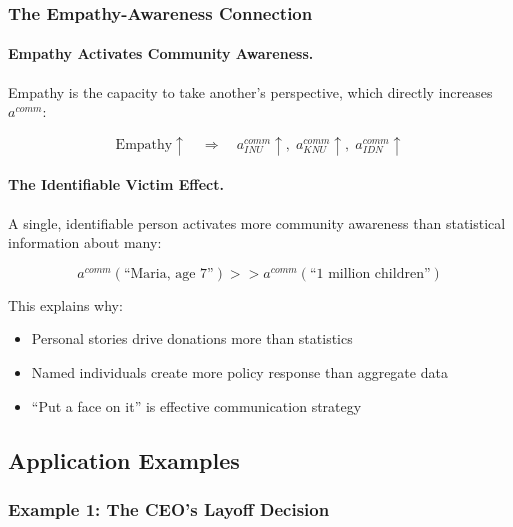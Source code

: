 \subsubsection{The Empathy-Awareness Connection}

\paragraph{Empathy Activates Community Awareness.}
Empathy is the capacity to take another's perspective, which directly 
increases $a^{comm}$:

\begin{equation}
\text{Empathy} \uparrow \quad \Rightarrow \quad a^{comm}_{INU} \uparrow, \; a^{comm}_{KNU} \uparrow, \; a^{comm}_{IDN} \uparrow
\end{equation}

\paragraph{The Identifiable Victim Effect.}
A single, identifiable person activates more community awareness than 
statistical information about many:

\begin{equation}
a^{comm}(\text{``Maria, age 7''}) >> a^{comm}(\text{``1 million children''})
\end{equation}

This explains why:
\begin{itemize}
\item Personal stories drive donations more than statistics
\item Named individuals create more policy response than aggregate data
\item ``Put a face on it'' is effective communication strategy
\end{itemize}

\subsection{Application Examples}
\label{subsec:awareness-examples}

\subsubsection{Example 1: The CEO's Layoff Decision}

